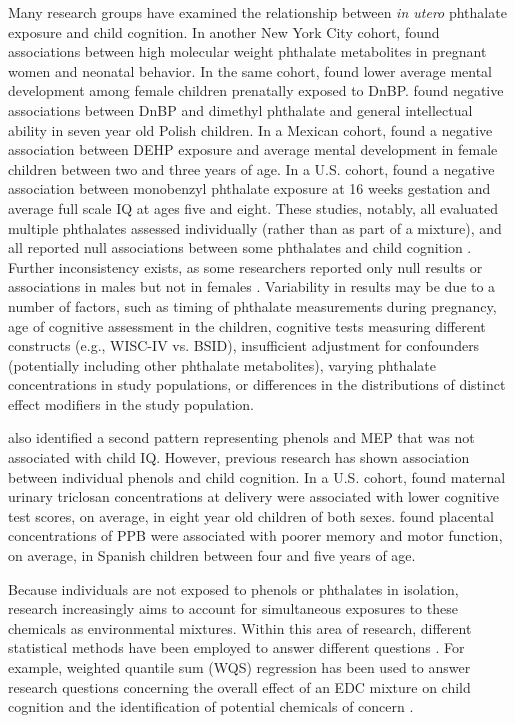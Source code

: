 Many research groups have examined the relationship between \textit{in utero} phthalate exposure and child cognition. In another New York City cohort, \citet{engel2009prenatal} found associations between high molecular weight phthalate metabolites in pregnant women and neonatal behavior. In the same cohort, \citet{doherty2017prenatal} found lower average mental development among female children prenatally exposed to DnBP. \citet{jankowska2019phthalate} found negative associations between DnBP and dimethyl phthalate and general intellectual ability in seven year old Polish children. In a Mexican cohort, \citet{tellez2013prenatal} found a negative association between DEHP exposure and average mental development in female children between two and three years of age. In a U.S. cohort, \citet{li2019identifying} found a negative association between monobenzyl phthalate exposure at 16 weeks gestation and average full scale IQ at ages five and eight. These studies, notably, all evaluated multiple phthalates assessed individually (rather than as part of a mixture), and all reported null associations between some phthalates and child cognition \citep{radke2020phthalate}. Further inconsistency exists, as some researchers reported only null results \citep{hyland2019prenatal, nakiwala2018utero} or associations in males but not in females \citep{zhu2020domain, torres2020early, kim2011prenatal}. Variability in results may be due to a number of factors, such as timing of phthalate measurements during pregnancy, age of cognitive assessment in the children, cognitive tests measuring different constructs (e.g., WISC-IV vs. BSID), insufficient adjustment for confounders (potentially including other phthalate metabolites), varying phthalate concentrations in study populations, or differences in the distributions of distinct effect modifiers in the study population. 

\bnmf also identified a second pattern representing phenols and MEP that was not associated with child IQ. However, previous 
research has shown association between individual phenols and child cognition. In a U.S. cohort, \citet{jackson2018identifying} found maternal urinary triclosan concentrations at delivery were associated with lower cognitive test scores, on average, in eight year old children of both sexes. \citet{freire2020association} found placental concentrations of PPB were associated with poorer memory and motor function, on average, in Spanish children between four and five years of age.

Because individuals are not exposed to phenols or phthalates in isolation, research increasingly aims to account for simultaneous exposures to these chemicals as environmental mixtures. Within this area of research, different statistical methods have been employed to answer different questions \citep{gibson2019complex}. For example, weighted quantile sum (WQS) regression has been used to answer research questions concerning the overall effect of an EDC mixture on child cognition and the identification of potential chemicals of concern \citet{tanner2020early, loftus2021exposure}.

